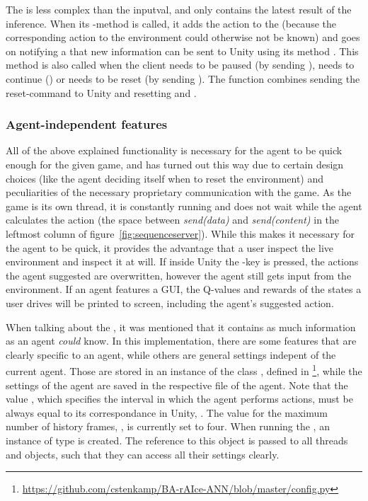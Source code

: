 The  is less complex than the inputval, and only contains the latest result of the inference. When its -method is called, it adds the action to the  (because the corresponding action to the environment could otherwise not be known) and goes on notifying a  that new information can be sent to Unity using its method . This method is also called when the client needs to be paused (by sending ), needs to continue () or needs to be reset (by sending ). The function  combines sending the reset-command to Unity and resetting  and .

\subsubsection{Agent-independent features}

All of the above explained functionality is necessary for the agent to be quick enough for the given game, and has turned out this way due to certain design choices (like the agent deciding itself when to reset the environment) and peculiarities of the necessary proprietary communication with the game. As the game is its own thread, it is constantly running and does not wait while the agent calculates the action (the space between \textit{send(data)} and \textit{send(content)} in the leftmost column of figure~\ref{fig:sequenceserver}). While this makes it necessary for the agent to be quick, it provides the advantage that a user inspect the live environment and inspect it at will. If inside Unity the -key is pressed, the actions the agent suggested are overwritten, however the agent still gets input from the environment. If an agent features a GUI, the Q-values and rewards of the states a user drives will be printed to screen, including the agent's suggested action.

When talking about the , it was mentioned that it contains as much information as an agent \textit{could} know. In this implementation, there are some features that are clearly specific to an agent, while others are general settings indepent of the current agent. Those are stored in an instance of the class , defined in \footnote{\url{https://github.com/cstenkamp/BA-rAIce-ANN/blob/master/config.py}}, while the settings of the agent are saved in the respective file of the agent. Note that the value , which specifies the interval in which the agent performs actions, must be always equal to its correspondance in Unity, . The value for the maximum number of history frames, , is currently set to four. When running the , an instance  of type  is created. The reference to this object is passed to all threads and objects, such that they can access all their settings clearly.


